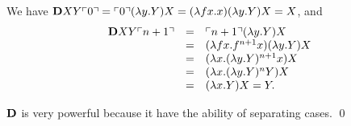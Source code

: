 \begin{pf} \rm
 We have $\mathbf{D} XY\ulcorner{0}\urcorner = 
  \ulcorner{0}\urcorner (\lambda y. Y) X
  = (\lambda fx. x) (\lambda y.Y) X = X
 $, and
 \[
\begin{array}{rcl}
 \mathbf{D} XY\ulcorner{n+1}\urcorner & = &
  \ulcorner{n+1}\urcorner (\lambda y. Y) X \\
  &=& (\lambda fx. f^{n+1} x)(\lambda y.Y) X \\
  &=& (\lambda x. (\lambda y.Y)^{n+1} x) X \\ 
  &=& (\lambda x. (\lambda y.Y)^n Y)X \\
  &=& (\lambda x. Y)X = Y.\\
\end{array}
  \]

\noindent $\mathbf{D}$ is very powerful because it have the ability of separating cases.
 \qed
\end{pf}
